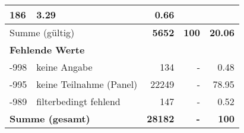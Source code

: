 \begin{longtable}{lXrrr}
       \num{186} &
       \num[round-mode=places,round-precision=2]{3,29} &
         \num[round-mode=places,round-precision=2]{0,66} \\
     \midrule
     \multicolumn{2}{l}{Summe (gültig)} &
       \textbf{\num{5652}} &
     \textbf{100} &
       \textbf{\num[round-mode=places,round-precision=2]{20,06}} \\
     \multicolumn{5}{l}{\textbf{Fehlende Werte}}\\
       -998 &
       keine Angabe &
         \num{134} &
        - &
         \num[round-mode=places,round-precision=2]{0,48} \\
       -995 &
       keine Teilnahme (Panel) &
         \num{22249} &
        - &
         \num[round-mode=places,round-precision=2]{78,95} \\
       -989 &
       filterbedingt fehlend &
         \num{147} &
        - &
         \num[round-mode=places,round-precision=2]{0,52} \\
     \midrule
     \multicolumn{2}{l}{\textbf{Summe (gesamt)}} &
          \textbf{\num{28182}} &
        \textbf{-} &
        \textbf{100} \\
     \bottomrule
     \end{longtable}
     
